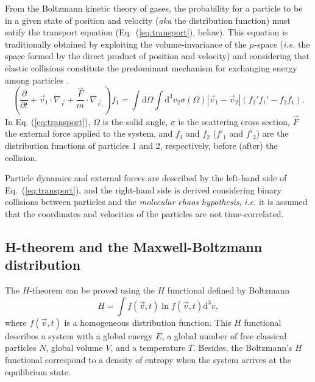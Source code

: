 From the Boltzmann kinetic theory of gases, the probability for a particle to be in a given
state of position and velocity (\textit{aka} the distribution function) must satify
the transport equation (Eq.~(\ref{eq:transport}), below).
This equation is traditionally obtained by exploiting the volume-invariance of the $\mu$-space
(\textit{i.e.} the space formed by the direct product of position and velocity)
and considering that elastic collisions constitute the predominant mechanism
for exchanging energy among particles \cite{bib:huang}.
%
\begin{equation}\label{eq:transport}
  \left(
    \frac{\partial}{\partial t}+\vec{v}_1 \cdot\nabla_{\vec r}
    +\frac{\vec{F}}{m}\cdot\nabla_{\vec v_1}
  \right)f_1=\int\mathrm{d}\Omega\int
    \mathrm{d}^{3}v_2\sigma(\Omega)|\vec{v}_1-\vec{v}_2|(f_2'f_1'-f_2f_1).
\end{equation}
%
In Eq. (\ref{eq:transport}), $\Omega$ is the solid angle, $\sigma$ is the
scattering cross section, $\vec F$ the
external force applied to the system, and $f_1$ and $f_2$ ($f'_1$ and $f'_2$) are the distribution
functions of particles 1 and 2, respectively, before (after) the collision.

Particle dynamics and external forces are described
by the left-hand side of Eq.~(\ref{eq:transport}), and the right-hand side
is derived considering binary collisions between particles and
the \textit{molecular chaos hypothesis}, \textit{i.e.} it is assumed that
the coordinates and velocities of the particles are not time-correlated.


\subsection{H-theorem and the Maxwell-Boltzmann distribution}
The $H$-theorem can be proved using the $H$ functional defined by Boltzmann 
%
\begin{equation}\label{eq:hfunctional}
   H=\int f(\vec{v},t) \ln f(\vec{v},t) \mathrm{d}^{3}v,
\end{equation} 
%
where $f(\vec{v},t)$ is a homogeneous distribution function.
This $H$ functional describes a system with a global energy $E$, a global
number of free classical particles $N$, global volume $V$, and a temperature $T$.
Besides, the Boltzmann's $H$ functional correspond to a density of entropy
when the system arrives at the equilibrium state.


